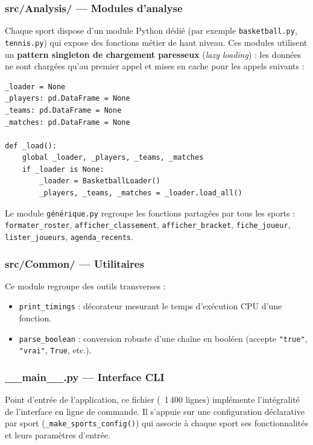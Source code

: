 \documentclass[12pt,a4paper]{article}
\newcommand{\code}[1]{\texttt{#1}}
\newcommand{\fichier}[1]{\texttt{#1}}
\begin{document}
\subsubsection{src/Analysis/ --- Modules d'analyse}

Chaque sport dispose d'un module Python dédié (par exemple \fichier{basketball.py},
\fichier{tennis.py}) qui expose des fonctions métier de haut niveau. Ces
modules utilisent un \textbf{pattern singleton de chargement paresseux}
(\textit{lazy loading}) : les données ne sont chargées qu'au premier appel et
mises en cache pour les appels suivants :

\begin{lstlisting}[caption={Pattern de chargement paresseux (extrait de basketball.py)}]
_loader = None
_players: pd.DataFrame = None
_teams: pd.DataFrame = None
_matches: pd.DataFrame = None

def _load():
    global _loader, _players, _teams, _matches
    if _loader is None:
        _loader = BasketballLoader()
        _players, _teams, _matches = _loader.load_all()
\end{lstlisting}

Le module \fichier{générique.py} regroupe les fonctions partagées par tous les
sports : \code{formater\_roster}, \code{afficher\_classement},
\code{afficher\_bracket}, \code{fiche\_joueur}, \code{lister\_joueurs},
\code{agenda\_recents}.

\subsubsection{src/Common/ --- Utilitaires}

Ce module regroupe des outils transverses :
\begin{itemize}
  \item \code{print\_timings} : décorateur mesurant le temps d'exécution
        CPU d'une fonction.
  \item \code{parse\_boolean} : conversion robuste d'une chaîne en booléen
        (accepte \code{"true"}, \code{"vrai"}, \code{True}, etc.).
\end{itemize}

\subsubsection{\_\_main\_\_.py --- Interface CLI}

Point d'entrée de l'application, ce fichier (~1\,400 lignes) implémente
l'intégralité de l'interface en ligne de commande. Il s'appuie sur une
configuration déclarative par sport (\code{\_make\_sports\_config()}) qui
associe à chaque sport ses fonctionnalités et leurs paramètres d'entrée.
\end{document}
